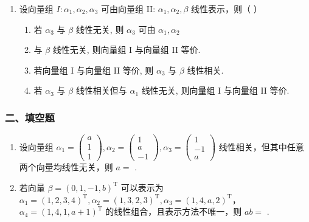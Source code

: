 \documentclass[12pt, a4paper]{ctexart}
\begin{document}
\begin{enumerate}
    \item 设向量组 $ I:\alpha_{1},\alpha_{2},\alpha_{3} $ 可由向量组 II: $ \alpha_{1},\alpha_{2},\beta $ 线性表示，则（ \underline{\hspace{1cm}} ）
    \begin{enumerate}[label=(\Alph*)]
        \item 若 $ \alpha_{3} $ 与 $ \beta $ 线性无关, 则 $ \alpha_{3} $ 可由 $ \alpha_{1}, \alpha_{2} $
        \item 与 $ \beta $ 线性无关, 则向量组 I 与向量组 II 等价.
        \item 若向量组 I 与向量组 II 等价, 则 $ \alpha_{3} $ 与 $ \beta $ 线性相关.
        \item 若 $ \alpha_{3} $ 与 $ \beta $ 线性相关但与 $ \alpha_{1} $ 线性无关, 则向量组 I 与向量组 II 等价.
    \end{enumerate}
\end{enumerate}

\subsubsection*{二、填空题}

\begin{enumerate}[start=8]
    \item 设向量组 $ \alpha_{1}=\begin{pmatrix} a \\ 1 \\ 1 \end{pmatrix}, \alpha_{2}=\begin{pmatrix} 1 \\ a \\ -1 \end{pmatrix}, \alpha_{3}=\begin{pmatrix} 1 \\ -1 \\ a \end{pmatrix} $ 线性相关，但其中任意两个向量均线性无关，则 $ a= $ \underline{\hspace{2cm}}.

    \item 若向量 $ \beta = (0, 1, -1, b)^{\mathrm{T}} $ 可以表示为 $ \alpha_1 = (1, 2, 3, 4)^{\mathrm{T}}, \alpha_2 = (1, 3, 2, 3)^{\mathrm{T}}, \alpha_3 = (1, 4, a, 2)^{\mathrm{T}} $， $ \alpha_4 = (1, 4, 1, a + 1)^{\mathrm{T}} $ 的线性组合，且表示方法不唯一，则 $ ab = $ \underline{\hspace{2cm}}.
\end{enumerate}
\end{document}
